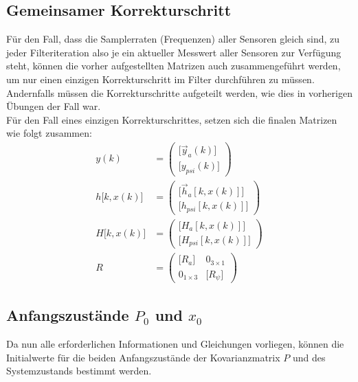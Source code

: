\documentclass[12pt,a4paper]{article}
\begin{document}
		\subsection{Gemeinsamer Korrekturschritt}
		Für den Fall, dass die Samplerraten (Frequenzen) aller Sensoren gleich sind, zu jeder Filteriteration also je ein aktueller Messwert aller Sensoren zur Verfügung steht, können die vorher aufgestellten Matrizen auch zusammengeführt werden, um nur einen einzigen Korrekturschritt im Filter durchführen zu müssen. Andernfalls müssen die Korrekturschritte aufgeteilt werden, wie dies in vorherigen Übungen der Fall war.\\
		Für den Fall eines einzigen Korrekturschrittes, setzen sich die finalen Matrizen wie folgt zusammen:
		\begin{align}
			y(k)&=\begin{pmatrix}
			\big[\vec{y}_{a}(k)\big]\\[0.5em]
			\big[y_{psi}(k)\big]
			\end{pmatrix}\\[1em]
			h\big[k,x(k)\big]&=\begin{pmatrix}
			\big[\vec{h}_{a}[k,x(k)]\big]\\[0.5em]
			\big[h_{psi}[k,x(k)]\big]
			\end{pmatrix}\\[1em]
			H\big[k,x(k)\big]&=\begin{pmatrix}
			\big[H_{a}[k,x(k)]\big]\\[0.5em]
			\big[H_{psi}[k,x(k)]\big]
			\end{pmatrix}\\[1em]
			R&=\begin{pmatrix}
			\big[R_{a}\big] & 0_{3\times 1} \\[0.5em]
			0_{1\times 3} & \big[R_{\psi}\big] 
			\end{pmatrix}
		\end{align}
		\subsection{Anfangszustände $P_{0}$ und $x_{0}$}\label{subsec:Anfangszustände}
		Da nun alle erforderlichen Informationen und Gleichungen vorliegen, können die Initialwerte für die beiden Anfangszustände der Kovarianzmatrix $P$ und des Systemzustands bestimmt werden.\\
		
\end{document}
